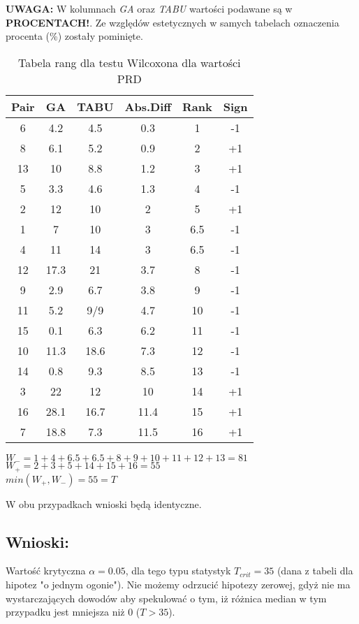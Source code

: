     \textbf{UWAGA:} W kolumnach \textit{GA} oraz \textit{TABU} wartości podawane są w \textbf{PROCENTACH!}. Ze względów estetycznych w samych tabelach oznaczenia procenta (\%) zostały pominięte.
    \begin{table}[H]
      \centering
      \begin{tabular}{| c | c | c | c | c | c |}
        \hline
        Pair & GA & TABU & Abs.Diff & Rank & Sign \\
        \hline
        6 & 4.2 & 4.5 & 0.3 & 1 & -1 \\
        8 & 6.1 & 5.2 & 0.9 & 2 & +1 \\
        13 & 10 & 8.8 & 1.2 & 3 & +1 \\
        5 & 3.3 & 4.6 & 1.3 & 4 & -1 \\
        2 & 12 & 10 & 2 & 5 & +1 \\
        1 & 7 & 10 & 3 & 6.5 & -1 \\
        4 & 11 & 14 & 3 & 6.5 & -1 \\
        12 & 17.3 & 21 & 3.7 & 8 & -1 \\
        9 & 2.9 & 6.7 & 3.8 & 9 & -1 \\
        11 & 5.2 & 9/9 & 4.7 & 10 & -1 \\
        15 & 0.1 & 6.3 & 6.2 & 11 & -1 \\
        10 & 11.3 & 18.6 & 7.3 & 12 & -1 \\
        14 & 0.8 & 9.3 & 8.5 & 13 & -1 \\
        3 & 22 & 12 & 10 & 14 & +1 \\
        16 & 28.1 & 16.7 & 11.4 & 15 & +1 \\
        7 & 18.8 & 7.3 & 11.5 & 16 & +1 \\
        \hline
          
      \end{tabular}
      \caption{Tabela rang dla testu Wilcoxona dla wartości PRD}
      $W_{-} = 1+4+6.5+6.5+8+9+10+11+12+13=81$ \\
      $W_{+} = 2+3+5+14+15+16=55 $ \\
      $min(W_{+},W_{-}) = 55 = T$ \\
  
    \end{table}
    W obu przypadkach wnioski będą identyczne.
  \subsection{Wnioski: }
    Wartość krytyczna $\alpha = 0.05$, dla tego typu statystyk $T_{crit} = 35$ (dana z tabeli dla hipotez "o jednym ogonie").
    Nie możemy odrzucić hipotezy zerowej, gdyż nie ma wystarczających dowodów aby spekulować o tym, iż różnica median w tym przypadku jest mniejsza niż 0 ($ T > 35$).